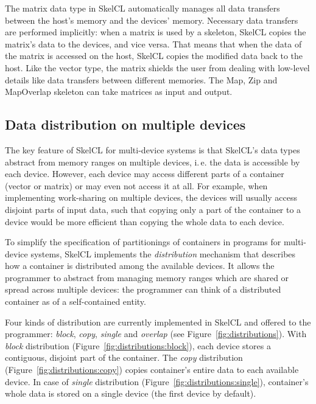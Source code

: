 The matrix data type in SkelCL automatically manages all data transfers between the host's memory and the devices' memory.
Necessary data transfers are performed implicitly:
when a matrix is used by a skeleton, SkelCL copies the matrix's data to the devices, and vice versa.
That means that when the data of the matrix is accessed on the host, SkelCL copies the modified data back to the host.
Like the vector type, the matrix shields the user from dealing with low-level details like data transfers between different memories.
The Map, Zip and MapOverlap skeleton can take matrices as input and output.

\subsection{Data distribution on multiple devices}
\label{sec:data_distribution}
The key feature of SkelCL for multi-device systems is that SkelCL's data types abstract from memory ranges on multiple devices, i.\,e. the data is accessible by each device.
However, each device may access different parts of a container (vector or matrix) or may even not access it at all.
For example, when implementing work-sharing on multiple devices, the devices will usually access disjoint parts of input data, such that copying only a part of the container to a device would be more efficient than copying the whole data to each device.

To simplify the specification of partitionings of containers in programs for multi-device systems, SkelCL implements the \emph{distribution} mechanism that describes how a container is distributed among the available devices.
It allows the programmer to abstract from managing memory ranges which are shared or spread across multiple devices:
the programmer can think of a distributed container as of a self-contained entity.

Four kinds of distribution are currently implemented in SkelCL and offered to the programmer:
\emph{block}, \emph{copy}, \emph{single} and \emph{overlap} (see Figure~\ref{fig:distributions}).
With \emph{block} distribution (Figure~\ref{fig:distributions:block}), each device stores a contiguous, disjoint part of the container.
The \emph{copy} distribution (Figure~\ref{fig:distributions:copy}) copies container's entire data to each available device.
In case of \emph{single} distribution (Figure~\ref{fig:distributions:single}), container's whole data is stored on a single device (the first device by default).

